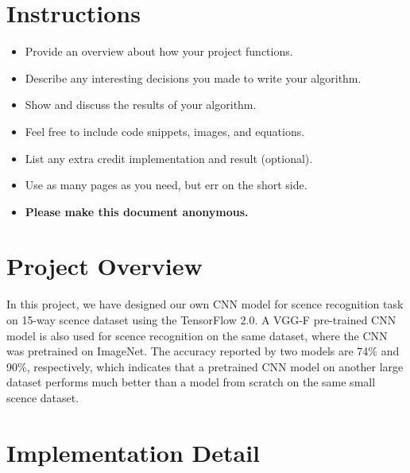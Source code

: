 \section*{Instructions}
\begin{itemize}
    \item Provide an overview about how your project functions.
    \item Describe any interesting decisions you made to write your algorithm.
    \item Show and discuss the results of your algorithm.
    \item Feel free to include code snippets, images, and equations.
    \item List any extra credit implementation and result (optional).
    \item Use as many pages as you need, but err on the short side.
    \item \textbf{Please make this document anonymous.}
\end{itemize}

\section*{Project Overview}

In this project, we have designed our own CNN model for scence recognition task on 15-way scence dataset using the TensorFlow 2.0. A VGG-F pre-trained CNN model is also used for scence recognition on the same dataset, where the CNN was pretrained on ImageNet. The accuracy reported by two models are 74\% and 90\%, respectively, which indicates that a pretrained CNN model on another large dataset performs much better than a model from scratch on the same small scence dataset.

\section*{Implementation Detail}

